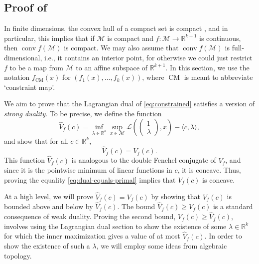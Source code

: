 \documentclass{article}
\numberwithin{equation}{section}
\newcommand{\R}{\mathbb{R}}
\DeclareMathOperator*{\conv}{conv}
\newcommand{\cM}{{\mathcal{M}}}
\newcommand{\Voptf}{V_{f}}
\begin{document}
\subsection{Proof of }
\label{subsec:main_proof}
In finite dimensions, the convex hull of a compact set is compact \cite[Corollary 2.4]{barvinok}, and in particular, this implies that if $\cM$ is compact and $f : \cM\rightarrow \R^{k+1}$ is continuous, then $\conv f(\cM)$ is compact. We may also assume that $\conv f(\cM)$ is full-dimensional, i.e., it contains an interior point, for otherwise we could just restrict $f$ to be a map from $\cM$ to an affine subspace of $\R^{k+1}$.
\newcommand{\fminuszero}{f_{\operatorname{CM}}}
In this section, we use the notation $\fminuszero(x)$ for  $(f_1(x),\dots,f_k(x))$, where $\operatorname{CM}$ is meant to abbreviate `constraint map'.

We aim to prove that the Lagrangian dual of \eqref{eq:constrained}
satisfies a version of \emph{strong duality}. To be precise, we define the function
\[
    \widehat{V}_f(c) = \inf_{\lambda \in \R^k} \sup_{x \in \cM} \mathcal{L}\left(\begin{pmatrix} 1\\ \lambda\end{pmatrix}, x\right) - \langle c, \lambda\rangle,
\]
and show that for all $c \in \R^{k}$,
\begin{equation}\label{eq:dual-equals-primal}
    \widehat{V}_f(c) = V_f(c).
\end{equation}
This function $\widehat{V}_f(c)$ is
analogous to the double Fenchel conjugate of $V_f$, and %
since it is the pointwise minimum of linear functions in $c$, it is concave.
Thus, %
proving
the equality 
\eqref{eq:dual-equals-primal} implies that $V_f(c)$ is concave.

At a high level, we will prove $\widehat{V}_f(c) = V_f(c)$ by showing that 
$\Voptf(c)$ is bounded above and below by $\widehat{V}_f(c)$.
The bound $\widehat{V}_f(c) \ge \Voptf(c)$ is a standard consequence of weak duality.
Proving the second bound, $\Voptf(c)\ge \widehat{V}_f(c)$, involves using the Lagrangian dual section to show the existence of some $\lambda \in \R^k$ for which the inner maximization gives a value of at most $\widehat{V}_f(c)$. In order to show the existence of such a $\lambda$, we will employ some ideas from algebraic topology.
\end{document}
